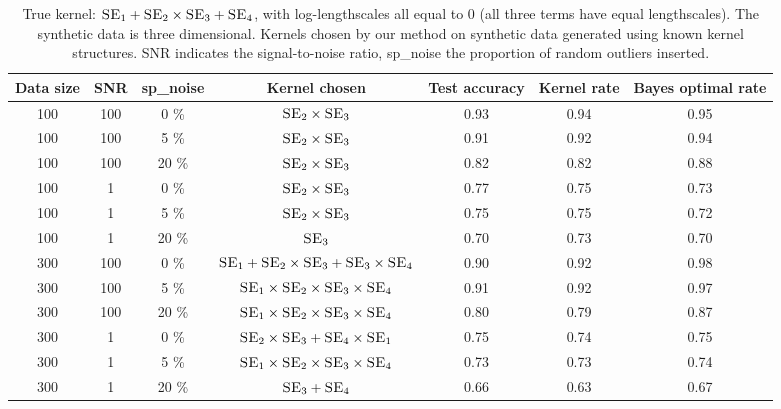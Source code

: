 \documentclass[twoside]{article}
\begin{document}
\begin{table*}[ht!]
\caption{{\small
True kernel: $ \textsc{SE}_1 + \textsc{SE}_2 \times \textsc{SE}_3 + \textsc{SE}_4$, with log-lengthscales all equal to 0 (all three terms have equal lengthscales). The synthetic data is three dimensional. 
Kernels chosen by our method on synthetic data generated using known kernel structures. SNR indicates the signal-to-noise ratio, sp\_noise the proportion of random outliers inserted.  
}} 

\label{tbl:synthetic2}
\begin{center}
{\small
\begin{tabular}{|c c  c | c |  c | c c| }
\hline Data size & SNR & sp\_noise &  Kernel chosen & Test accuracy & Kernel rate & Bayes optimal rate \\
\hline 
100    &   100  &  0 \%   &    $\textsc{SE}_2 \times \textsc{SE}_3$   &    0.93  &  0.94 & 0.95 \\
100    &   100  &  5 \%   &    $\textsc{SE}_2 \times \textsc{SE}_3$  &    0.91  &  0.92 & 0.94 \\
100    &   100  &  20 \%   &    $\textsc{SE}_2 \times \textsc{SE}_3$  &    0.82  &  0.82 & 0.88 \\ 
100    &   1  &  0 \%    &     $\textsc{SE}_2 \times \textsc{SE}_3$  &    0.77  &  0.75 & 0.73    \\
100    &   1  &  5 \%    &    $\textsc{SE}_2 \times \textsc{SE}_3$  &    0.75  &  0.75 & 0.72    \\
100    &   1  &  20 \%   &    $ \textsc{SE}_3 $ &    0.70  &  0.73 & 0.70 \\

\hline  300    &   100  &  0 \%   &    $ \textsc{SE}_1 + \textsc{SE}_2 \times \textsc{SE}_3 + \textsc{SE}_3 \times \textsc{SE}_4  $   &    0.90  &  0.92 & 0.98 \\
300    &   100  &  5 \%   &    $ \textsc{SE}_1 \times \textsc{SE}_2 \times \textsc{SE}_3 \times \textsc{SE}_4 $   &    0.91  &  0.92 & 0.97 \\
300    &   100  &  20 \%   &   $ \textsc{SE}_1 \times \textsc{SE}_2 \times \textsc{SE}_3 \times \textsc{SE}_4 $   &   0.80  &  0.79 & 0.87 \\ 
300    &   1  &  0 \%   &    $ \textsc{SE}_2 \times \textsc{SE}_3 + \textsc{SE}_4 \times \textsc{SE}_1 $   &    0.75  &  0.74 & 0.75    \\
300    &   1  &  5 \%   &   $ \textsc{SE}_1 \times \textsc{SE}_2 \times \textsc{SE}_3 \times \textsc{SE}_4 $   &    0.73  &  0.73 & 0.74    \\
300    &   1  &  20 \%   &    $\textsc{SE}_3 + \textsc{SE}_4$ &    0.66  &  0.63 & 0.67 \\


\end{tabular}}
\end{center}
\end{table*}
\end{document}
